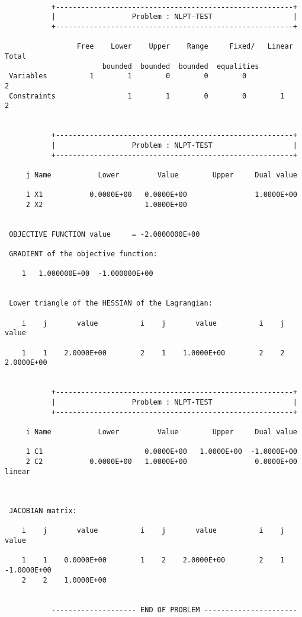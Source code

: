 \documentclass{galahad}
\begin{document}
{\small
\begin{verbatim}

           +--------------------------------------------------------+
           |                  Problem : NLPT-TEST                   |
           +--------------------------------------------------------+

                 Free    Lower    Upper    Range     Fixed/   Linear  Total
                       bounded  bounded  bounded  equalities
 Variables          1        1        0        0        0                 2
 Constraints                 1        1        0        0        1        2


           +--------------------------------------------------------+
           |                  Problem : NLPT-TEST                   |
           +--------------------------------------------------------+

     j Name           Lower         Value        Upper     Dual value

     1 X1           0.0000E+00   0.0000E+00                1.0000E+00
     2 X2                        1.0000E+00


 OBJECTIVE FUNCTION value     = -2.0000000E+00

 GRADIENT of the objective function:

    1   1.000000E+00  -1.000000E+00


 Lower triangle of the HESSIAN of the Lagrangian:

    i    j       value          i    j       value          i    j       value

    1    1    2.0000E+00        2    1    1.0000E+00        2    2    2.0000E+00


           +--------------------------------------------------------+
           |                  Problem : NLPT-TEST                   |
           +--------------------------------------------------------+

     i Name           Lower         Value        Upper     Dual value

     1 C1                        0.0000E+00   1.0000E+00  -1.0000E+00
     2 C2           0.0000E+00   1.0000E+00                0.0000E+00     linear



 JACOBIAN matrix:

    i    j       value          i    j       value          i    j       value

    1    1    0.0000E+00        1    2    2.0000E+00        2    1   -1.0000E+00
    2    2    1.0000E+00


           -------------------- END OF PROBLEM ----------------------

\end{verbatim}
}
\end{document}
